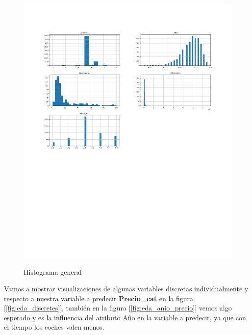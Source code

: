 \documentclass[12pt,twoside]{report}
\begin{document}
\begin{figure}[H]
\caption{Histograma general}
\includegraphics[width=\textwidth]{../notebooks/figures/hist.png}
\label{fig:features-distribucions}
\end{figure}

Vamos a mostrar visualizaciones de algunas variables discretas individualmente y respecto a nuestra variable a predecir \textbf{Precio\_cat} en la figura [\ref{fig:eda_discretes}], también en la figura [\ref{fig:eda_anio_precio}] vemos algo esperado y es la influencia del atributo Año en la variable a predecir, ya que con el tiempo los coches valen menos.
\end{document}
